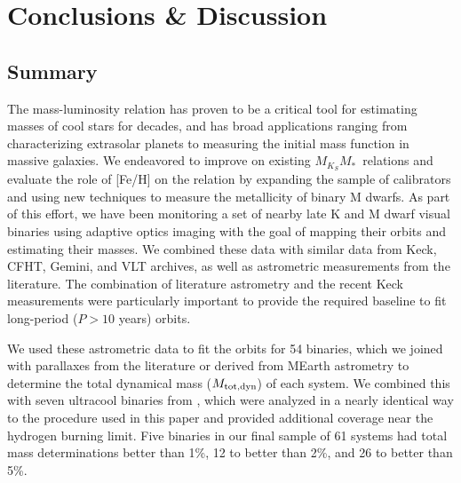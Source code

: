 \documentclass[twocolumn]{aastex62}
\newcommand{\mks}{$M_{K_S}$}
\newcommand{\mmk}{$M_{K_S}$\textendash$M_*$}
\newcommand{\mdyn}{$M_{\rm{tot,dyn}}$}
\begin{document}
\section{Conclusions \& Discussion}\label{sec:discussion} 

\subsection{Summary}

The mass-luminosity relation has proven to be a critical tool for estimating masses of cool stars for decades, and has broad applications ranging from characterizing extrasolar planets to measuring the initial mass function in massive galaxies. We endeavored to improve on existing \mmk\ relations and evaluate the role of [Fe/H] on the relation by expanding the sample of calibrators and using new techniques to measure the metallicity of binary M dwarfs. As part of this effort, we have been monitoring a set of nearby late K and M dwarf visual binaries using adaptive optics imaging with the goal of mapping their orbits and estimating their masses. We combined these data with similar data from Keck, CFHT, Gemini, and VLT archives, as well as astrometric measurements from the literature. The combination of literature astrometry and the recent Keck measurements were particularly important to provide the required baseline to fit long-period ($P>10$ years) orbits. 

We used these astrometric data to fit the orbits for 54 binaries, which we joined with parallaxes from the literature or derived from MEarth astrometry to determine the total dynamical mass (\mdyn) of each system. We combined this with seven ultracool binaries from \citep{Dupuy2017}, which were analyzed in a nearly identical way to the procedure used in this paper and provided additional coverage near the hydrogen burning limit. Five binaries in our final sample of 61 systems had total mass determinations better than 1\%, 12 to better than 2\%, and 26 to better than 5\%. 
\end{document}
